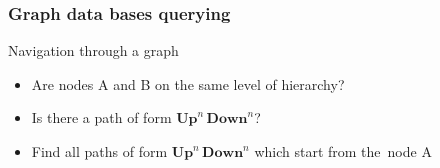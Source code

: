 \documentclass[xcolor=table]{beamer}
\begin{document}
\begin{frame} \frametitle{Graph data bases querying}

  \begin{minipage}[m]{0.45\linewidth}
  \end{minipage}\hfill
  \begin{minipage}[m]{0.5\linewidth}
  Navigation through a graph
  \begin{itemize}
        \item Are nodes A and B on the same level of hierarchy?
        \item Is there a path of form $\textbf{Up}^n \, \textbf{Down}^n$?
        \item Find all paths of form $\textbf{Up}^n \, \textbf{Down}^n$ which start from the~node A
  \end{itemize}

  \end{minipage}


\end{frame}
\end{document}
